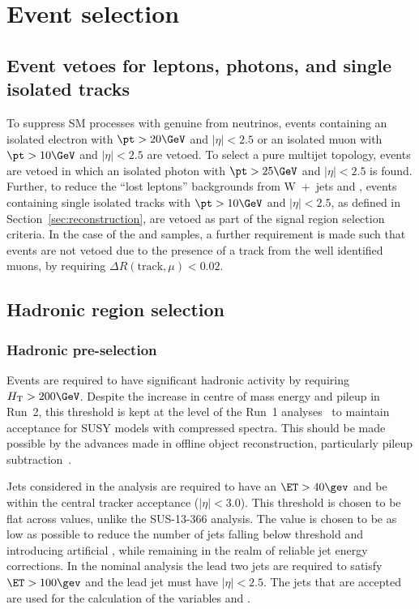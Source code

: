 \section{Event selection}
\label{sec:selection}

\subsection{Event vetoes for leptons, photons, and single isolated tracks\label{sec:vetoes}}

To suppress SM processes with genuine \met from neutrinos, events
containing an isolated electron with $\pt > 20\GeV$ and $|\eta| < 2.5$ or an isolated muon
with $\pt > 10\GeV$ and $|\eta| < 2.5$ are vetoed. To select a pure
multijet topology, events are vetoed in which an isolated
photon with $\pt > 25\GeV$ and $|\eta| < 2.5$ is
found.  Further, to reduce the ``lost leptons'' backgrounds from W~+~jets 
and \ttbar, events containing single isolated tracks with $\pt >
10\GeV$ and $|\eta| < 2.5$, as defined in
Section~\ref{sec:reconstruction}, are vetoed as part of the signal
region selection criteria. In the case of the \mj and \mmj
samples, a further requirement is made such that events are not vetoed
due to the presence of a track from the well identified muons, by
requiring $\Delta R(\textrm{track},\mu) < 0.02$.


\subsection{Hadronic region selection}

\subsubsection{Hadronic pre-selection}
Events are required to have significant hadronic activity by requiring
$\scalht > 200\GeV$. Despite the increase in centre of mass energy and pileup
in Run~2, this threshold is kept at the level of the Run~1 analyses~\cite{run1Analyses}  
to maintain acceptance for SUSY models with compressed spectra. This should be
made possible by the advances made in offline object reconstruction, particularly pileup
subtraction~\cite{puppi}.

Jets considered in the analysis are required to have an $\ET>40\gev$ and be
within the central tracker acceptance ($|\eta|<3.0$). This threshold is chosen
to be flat across \HT values, unlike the SUS-13-366 analysis. The \ET value is
chosen to be as low as possible to reduce the number of jets falling below
threshold and introducing artificial \mht, while remaining in the realm of
reliable jet energy corrections. In the nominal analysis the lead two jets 
are required to satisfy $\ET>100\gev$ and the lead jet must
have $|\eta|<2.5$. The jets that are accepted are used for the calculation of
the variables \HT and \mht.

